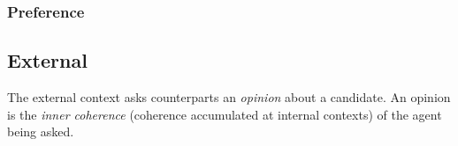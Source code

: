 
\subsubsection{Preference}


\subsection{External}

The external context asks counterparts an \emph{opinion} about a candidate.
An opinion is the \emph{inner coherence} (coherence accumulated at internal
contexts) of the agent being asked.


%
